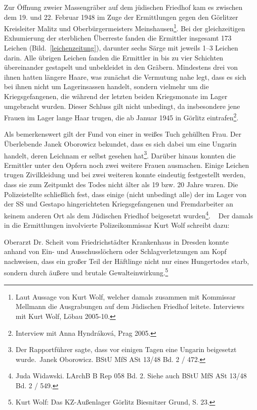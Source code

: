 \newline
Zur Öffnung zweier Massengräber auf dem jüdischen Friedhof kam es zwischen dem 19. und 22. Februar 1948 im Zuge der Ermittlungen gegen den Görlitzer Kreisleiter Malitz und Oberbürgermeisters Meinshausen\footnote{Laut Aussage von Kurt Wolf, welcher damals zusammen mit Kommissar Mellmann die Ausgrabungen auf dem Jüdischen Friedhof leitete. Interviews mit Kurt Wolf, Löbau 2005-10.}. 
Bei der gleichzeitigen Exhumierung der sterblichen Überreste fanden die Ermittler insgesamt 173 Leichen (Bild.~\ref{leichenzeitung}), darunter sechs Särge mit jeweils 1--3 Leichen darin. Alle übrigen Leichen fanden die Ermittler in bis zu vier Schichten übereinander gestapelt und unbekleidet in den Gräbern. Mindestens\label{weiss} drei von ihnen hatten längere Haare, was zunächst die Vermutung nahe legt, dass es sich bei ihnen nicht um Lagerinsassen handelt, sondern vielmehr um die Kriegsgefangenen, die während der letzten beiden Kriegsmonate im Lager umgebracht wurden. Dieser Schluss gilt nicht unbedingt, da insbesondere jene Frauen im Lager lange Haar trugen, die ab Januar 1945 in Görlitz eintrafen\footnote{Interview mit Anna Hyndr\'akov\'a, Prag 2005.}. 

Als bemerkenswert gilt der Fund von einer in weißes Tuch gehüllten Frau. Der Überlebende Janek Oborowicz bekundet, dass es sich dabei um eine Ungarin handelt, deren Leichnam er selbst gesehen hat\footnote{\glqq Der Rapportführer sagte, dass vor einigen Tagen eine Ungarin beigesetzt wurde.\grqq~Janek Oborowicz. BStU MfS ASt 13/48 Bd. 2 / 472.}. Darüber hinaus konnten die Ermittler unter den Opfern noch zwei weitere Frauen ausmachen. Einige Leichen trugen Zivilkleidung und bei zwei weiteren konnte eindeutig festgestellt werden, dass sie zum Zeitpunkt des Todes nicht älter als 19 bzw. 20 Jahre waren.
Die Polizei\linebreak\newpage stellte schließlich fest, dass einige (nicht unbedingt alle) der im Lager von der SS und Gestapo hingerichteten Kriegsgefangenen und Fremdarbeiter an keinem anderen Ort als dem Jüdischen Friedhof beigesetzt wurden\footnote{Juda Widawski. LArchB B Rep 058 Bd. 2. Siehe auch BStU MfS ASt 13/48 Bd. 2 / 549.}.
~\newline
Der damals in die Ermittlungen involvierte Polizeikommissar Kurt Wolf schreibt dazu:
\begin{leftbar}
Oberarzt Dr. Scheit vom Friedrichstädter Krankenhaus in Dresden konnte anhand von Ein- und Ausschusslöchern oder Schlagverletzungen am Kopf nachweisen, dass ein großer Teil der Häftlinge nicht nur eines Hungertodes starb, sondern durch äußere und brutale Gewalteinwirkung.\footnote{Kurt Wolf: Das KZ-Außenlager Görlitz Biesnitzer Grund, S. 23.}
\end{leftbar}

